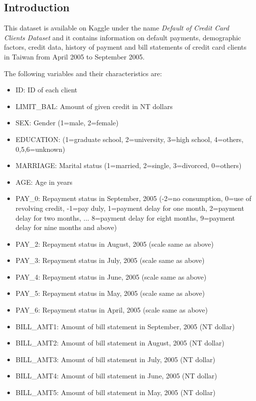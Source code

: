 \documentclass[11pt]{article}
\begin{document}
\begin{multicols}{2}
\section{Introduction}
This dataset is available on Kaggle under the name \textit{Default of Credit Card Clients Dataset} and it  contains information on default payments, demographic factors, credit data, history of payment and bill statements of credit card clients in Taiwan from April 2005 to September 2005.

The following variables and their characteristics are:
\begin{itemize}[noitemsep]
\item ID: ID of each client
\item LIMIT\_BAL: Amount of given credit in NT dollars
\item SEX: Gender (1=male, 2=female)
\item EDUCATION: (1=graduate school, 2=university, 3=high school, 4=others, 0,5,6=unknown)
\item MARRIAGE: Marital status (1=married, 2=single, 3=divorced, 0=others)
\item AGE: Age in years
\item PAY\_0: Repayment status in September, 2005 (-2=no consumption, 0=use of revolving credit, -1=pay duly, 1=payment delay for one month, 2=payment delay for two months, ... 8=payment delay for eight months, 9=payment delay for nine months and above)
\item PAY\_2: Repayment status in August, 2005 (scale same as above)
\item PAY\_3: Repayment status in July, 2005 (scale same as above)
\item PAY\_4: Repayment status in June, 2005 (scale same as above)
\item PAY\_5: Repayment status in May, 2005 (scale same as above)
\item PAY\_6: Repayment status in April, 2005 (scale same as above)
\item BILL\_AMT1: Amount of bill statement in September, 2005 (NT dollar)
\item BILL\_AMT2: Amount of bill statement in August, 2005 (NT dollar)
\item BILL\_AMT3: Amount of bill statement in July, 2005 (NT dollar)
\item BILL\_AMT4: Amount of bill statement in June, 2005 (NT dollar)
\item BILL\_AMT5: Amount of bill statement in May, 2005 (NT dollar)

\end{itemize}
\end{multicols}
\end{document}
